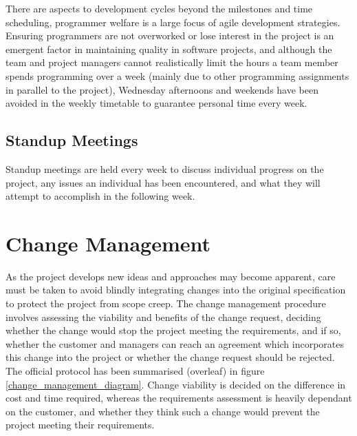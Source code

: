 \begin{fullwidth}
\begin{fullwidth}
There are aspects to development cycles beyond the milestones and time scheduling, programmer welfare is a large focus of agile development strategies. Ensuring programmers are not overworked or lose interest in the project is an emergent factor in maintaining quality in software projects, and although the team and project managers cannot realistically limit the hours a team member spends programming over a week (mainly due to other programming assignments in parallel to the project), Wednesday afternoons and weekends have been avoided in the weekly timetable to guarantee personal time every week.

\subsection{Standup Meetings}
Standup meetings are held every week to discuss individual progress on the project, any issues an individual has been encountered, and what they will attempt to accomplish in the following week.

\section{Change Management}
As the project develops new ideas and approaches may become apparent, care must be taken to avoid blindly integrating changes into the original specification to protect the project from scope creep. The change management procedure involves assessing the viability and benefits of the change request, deciding whether the change would stop the project meeting the requirements, and if so, whether the customer and managers can reach an agreement which incorporates this change into the project or whether the change request should be rejected. The official protocol has been summarised (overleaf) in figure \ref{change_management_diagram}. Change viability is decided on the difference in cost and time required, whereas the requirements assessment is heavily dependant on the customer, and whether they think such a change would prevent the project meeting their requirements.

\end{fullwidth}
\clearpage


\end{fullwidth}
